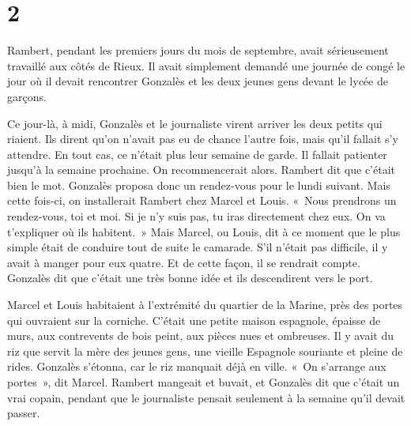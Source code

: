 \documentclass[french,twoside]{book} %
\begin{document}
\section[{2}]{2}
\noindent Rambert, pendant les premiers jours du mois de septembre, avait sérieusement travaillé aux côtés de Rieux. Il avait simplement demandé une journée de congé le jour où il devait rencontrer Gonzalès et les deux jeunes gens devant le lycée de garçons.\par
Ce jour-là, à midi, Gonzalès et le journaliste virent arriver les deux petits qui riaient. Ils dirent qu’on n’avait pas eu de chance l’autre fois, mais qu’il fallait s’y attendre. En tout cas, ce n’était plus leur semaine de garde. Il fallait patienter jusqu’à la semaine prochaine. On recommencerait alors. Rambert dit que c’était bien le mot. Gonzalès proposa donc un rendez-vous pour le lundi suivant. Mais cette fois-ci, on installerait Rambert chez Marcel et Louis. « Nous prendrons un rendez-vous, toi et moi. Si je n’y suis pas, tu iras directement chez eux. On va t’expliquer où ils habitent. » Mais Marcel, ou Louis, dit à ce moment que le plus simple était de conduire tout de suite le camarade. S’il n’était pas difficile, il y avait à manger pour eux quatre. Et de cette façon, il se rendrait compte. Gonzalès dit que c’était une très bonne idée et ils descendirent vers le port.\par
Marcel et Louis habitaient à l’extrémité du quartier de la Marine, près des portes qui ouvraient sur la corniche. C’était une petite maison espagnole, épaisse de murs, aux contrevents de bois peint, aux pièces nues et ombreuses. Il y avait du riz que servit la mère des jeunes gens, une vieille Espagnole souriante et pleine de rides. Gonzalès s’étonna, car le riz manquait déjà en ville. « On s’arrange aux portes », dit Marcel. Rambert mangeait et buvait, et Gonzalès dit que c’était un vrai copain, pendant que le journaliste pensait seulement à la semaine qu’il devait passer.\par
\end{document}
